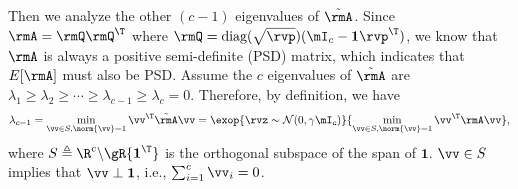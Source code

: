 \begin{proofof}{}
Then we analyze the other $(c-1)$ eigenvalues of $\tilde{\rmA}$. Since $\rmA=\rmQ\rmQ^\T$ where $\rmQ=\text{diag}(\sqrt{\rvp})(\mI_c-\textbf{1}\rvp^\T)$, we know that $\rmA$ is always a positive semi-definite (PSD) matrix, which indicates that $E[\rmA]$ must also be PSD. Assume the $c$ eigenvalues of $\tilde{\rmA}$ are $\lambda_1\geq\lambda_2\geq\cdots\geq\lambda_{c-1}\geq\lambda_c=0$. Therefore, by definition, we have
\begin{equation}
\lambda_{c-1} = \min_{\vv\in S, \norm{\vv}=1}\vv^\T\tilde{\rmA}\vv = \exop{\rvz\sim\mathcal{N}(0,\gamma \mI_c)}{\min_{\vv\in S, \norm{\vv}=1}\vv^\T\rmA\vv},
\end{equation}
where $S\triangleq\R^c\backslash\gR\{\textbf{1}^\T\}$ is the orthogonal subspace of the span of $\textbf{1}$. $\vv\in S$ implies that $\vv\perp\textbf{1}$, i.e., $\sum_{i=1}^c \vv_i = 0$.


\end{proofof}
